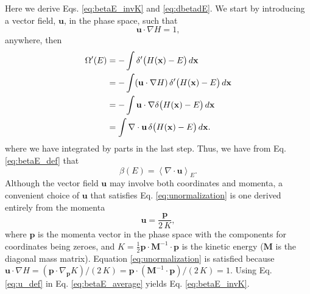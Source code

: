 \documentclass[preprint]{revtex4-1}
\begin{document}
Here we derive Eqs. \eqref{eq:betaE_invK} and \eqref{eq:dbetadE}.
We start by introducing a vector field, $\mathbf u$,
in the phase space,
such that
%
\begin{equation}
  \mathbf u \cdot \nabla H = 1
  ,
  \label{eq:unormalization}
\end{equation}
%
anywhere, then
%
\begin{align}
  \Omega'(E)
  &= -\int \delta'\bigl( H(\mathbf x) - E \bigr) \, d\mathbf x
     \notag \\
  &= -\int (\mathbf u \cdot \nabla H) \,
           \delta'\bigl( H(\mathbf x) - E \bigr) \, d\mathbf x
     \notag \\
  &= -\int \mathbf u \cdot
           \nabla \delta\bigl( H(\mathbf x) - E \bigr) \, d\mathbf x
     \notag \\
  &= \int \nabla \cdot \mathbf u \,
     \delta\bigl( H(\mathbf x) - E \bigr) \, d\mathbf x
  .
  \notag
\end{align}
%
where we have integrated by parts in the last step.
%
Thus, we have from Eq. \eqref{eq:betaE_def} that
%
\begin{equation}
  \beta(E)
  =
  \left\langle
    \nabla \cdot \mathbf u
  \right\rangle_E
  .
  \label{eq:betaE_average}
\end{equation}
%
Although the vector field $\mathbf u$ may involve both coordinates and momenta,
a convenient choice of $\mathbf u$ that satisfies
Eq. \eqref{eq:unormalization}
is one derived entirely from the momenta
%
\begin{equation}
  \mathbf u
  =
  \frac{ \mathbf p }
       {  2 \, K }
  ,
  \label{eq:u_def}
\end{equation}
where $\mathbf p$ is the momenta vector in the phase space
with the components for coordinates being zeroes,
and $K = \frac 1 2 \mathbf p \cdot \mathbf M^{-1} \cdot \mathbf p$
is the kinetic energy ($\mathbf M$ is the diagonal mass matrix).
%
Equation \eqref{eq:unormalization} is satisfied
because
$\mathbf u \cdot \nabla H
= (\mathbf p \cdot \nabla_{\mathbf p} K)/(2 \, K)
= \mathbf p \cdot (\mathbf M^{-1} \cdot \mathbf p) / (2 \, K) = 1$.
%
Using Eq. \eqref{eq:u_def} in Eq. \eqref{eq:betaE_average}
yields Eq. \eqref{eq:betaE_invK}.
\end{document}
